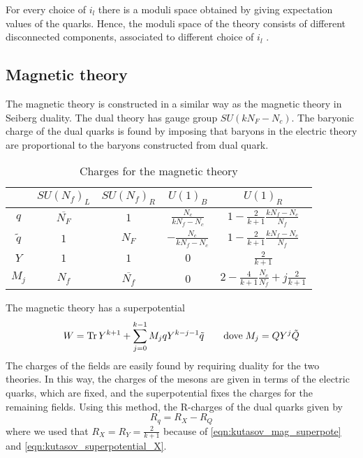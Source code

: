 For every choice of ${i_l}$ there is a moduli space obtained by giving expectation values of the quarks.
Hence, the moduli space of the theory consists of different disconnected components, associated to different choice of ${i_l}$ .



\subsection{Magnetic theory}
The magnetic theory is constructed in a similar way as the magnetic theory in Seiberg duality.
The dual theory has gauge group $SU(k N_F - N_c)$. 
The baryonic charge of the dual quarks is found by imposing that baryons in the electric theory are proportional to the baryons constructed from dual quark.
\begin{table}[h!]
\begin{tabular}{c  c c c c }
 & $SU(N_f)_L$  &$SU(N_f)_R $  & $U(1)_B$ &  $U(1)_R$ \\
\hline
$q$ & $\overline{N_F}$  & $1$   &  $ \frac{N_c}{k N_f - N_c }$  & $ 1 - \frac{2}{k+1} \frac{ k N_f  - N_c}{N_f}$  \\
$\tilde{q}$  & $1 $ &  $N_F$  & $-\frac{N_c}{k N_f - N_c }$   &  $ 1 - \frac{2}{k+1} \frac{k N_f - N_c}{N_f}$   \\
$Y$ & $1$   &$ 1$    &$ 0$   &  $\frac{2}{k+1}$ \\
$ M_j$ & $N_f$ & $ \overline{N_f}$ & 0 & $2 - \frac{4}{k+1} \frac{N_c}{N_f} + j \frac{2}{k+1}$ \\
\end{tabular}
\centering
\caption{Charges for the magnetic theory}
\label{table:charge_table_mag_ks_4d}
\end{table}
The magnetic theory has a superpotential
\begin{equation}
W = \mathrm{Tr } \, Y^{k+1} + \sum_{j=0}^{k-1} M_j q Y^{k-j-1} \tilde{q} \qquad \hbox{dove} \; M_j = Q Y^j \tilde{Q}
\label{eqn:kutasov_mag_superpote}
\end{equation}
The charges of the fields are easily found by requiring duality for the two theories.
In this way, the charges of the mesons are given in terms of the electric quarks, which are fixed, and the superpotential fixes the charges for the remaining fields.
Using this method, the R-charges of the dual quarks given by
\begin{equation}
   R_q = R_X - R_Q 
 \label{eqn:R-charge_dual_quark}
\end{equation}
where we used that $R_X = R_Y = \frac{2}{k+1}$ because of \eqref{eqn:kutasov_mag_superpote} and \eqref{eqn:kutasov_superpotential_X}.















